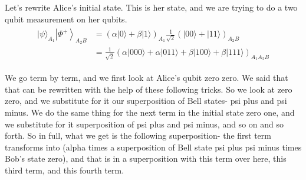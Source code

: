 Let's rewrite Alice's initial state. This is her state, and we are trying to do a two qubit measurement on her qubits.
\begin{align}
    \begin{aligned}
|\psi\rangle_{A_{1}}\left|\Phi^{+}\right\rangle_{A_{2} B} &=(\alpha|0\rangle+\beta|1\rangle)_{A_{1}} \frac{1}{\sqrt{2}}(|00\rangle+|11\rangle)_{A_{2} B} \\
&=\frac{1}{\sqrt{2}}(\alpha|000\rangle+\alpha|011\rangle+\beta|100\rangle+\beta|111\rangle)_{A_{1} A_{2} B}
\end{aligned}
\end{align}

We go term by term, and we first look at Alice's qubit zero zero. We said that that can be rewritten with the help of these following tricks. So we look at zero zero, and we substitute for it our superposition of Bell states- psi plus and psi minus. We do the same thing for the next term in the initial state zero one, and we substitute for it superposition of psi plus and psi minus, and so on and so forth. So in full, what we get is the following superposition- the first term transforms into (alpha times a superposition of Bell state psi plus psi minus times Bob's state zero), and that is in a superposition with this term over here, this third term, and this fourth term.


